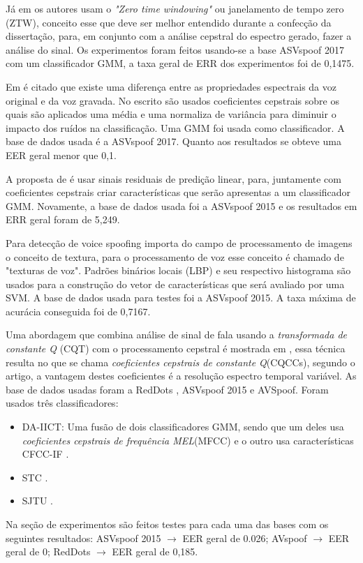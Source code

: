 \begin{myenv}{1.5}
		\par Já em \cite{alluri2019replay} os autores usam o \textit{"Zero time windowing"} ou janelamento de tempo zero (ZTW), conceito esse que deve ser melhor entendido durante a confecção da dissertação, para, em conjunto com a análise cepstral do espectro gerado, fazer a análise do sinal. Os experimentos foram feitos usando-se a base ASVspoof 2017\cite{ASVspoof2017} com um classificador GMM, a taxa geral de ERR dos experimentos foi de 0,1475.
		
		\par Em \cite{8725688} é citado que existe uma diferença entre as propriedades espectrais da voz original e da voz gravada. No escrito são usados coeficientes cepstrais sobre os quais são aplicados uma média e uma normaliza de variância para diminuir o impacto dos ruídos na classificação. Uma GMM foi usada como classificador. A base de dados usada é a ASVspoof 2017. Quanto aos resultados se obteve uma EER geral menor que 0,1.
	
		\par A proposta de \cite{Hanilci2018} é usar sinais residuais de predição linear, para, juntamente com coeficientes cepstrais criar características que serão apresentas a um classificador GMM. Novamente, a base de dados usada foi a ASVspoof 2015 e os resultados em ERR geral foram de 5,249.

		\par Para detecção de voice spoofing  \cite{ISI:000473343500086} importa do campo de processamento de imagens o conceito de textura, para o processamento de voz esse conceito é chamado de "texturas de voz". Padrões binários locais (LBP) e seu respectivo histograma são usados para a construção do vetor de características que será avaliado por uma SVM. A base de dados usada para testes foi a ASVspoof 2015. A taxa máxima de acurácia conseguida foi de 0,7167.
		
		\par Uma abordagem que combina análise de sinal de fala usando a \textit{transformada de constante Q} (CQT) com o processamento cepstral é mostrada em \cite{TODISCO2017516}, essa técnica resulta no que se chama \textit{coeficientes cepstrais de constante Q}(CQCCs), segundo o artigo, a vantagem destes coeficientes é a resolução espectro temporal variável. As base de dados usadas foram a RedDots \cite{redDots}, ASVspoof 2015 e AVSpoof. Foram usados três classificadores:
		\begin{itemize}
			\item DA-IICT: Uma fusão de dois classificadores GMM, sendo que um deles usa \textit{coeficientes cepstrais de frequência MEL}(MFCC) e o outro usa características CFCC-IF \cite{Patel2015}.
			\item STC \cite{7472724}.
			\item SJTU \cite{korshunov2016overview}.
		\end{itemize}			
		Na seção de experimentos são feitos testes para cada uma das bases com os seguintes resultados: ASVspoof 2015 $\rightarrow$ EER geral de 0.026; AVspoof $\rightarrow$ EER geral de 0; RedDots $\rightarrow$ EER geral de 0,185.


\end{myenv}
